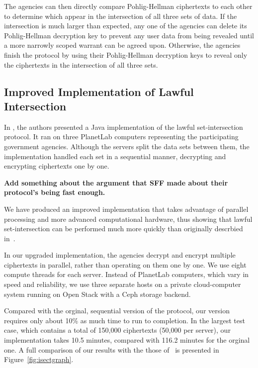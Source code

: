 The agencies can then directly compare Pohlig-Hellman ciphertexts to each 
other to determine which appear in the intersection of all three sets of data. 
If the intersection is much larger than expected, any one of the agencies can 
delete its Pohlig-Hellman decryption key to prevent any user data from being 
revealed until a more narrowly scoped warrant can be agreed upon. Otherwise, 
the agencies finish the protocol by using their Pohlig-Hellman decryption keys 
to reveal only the ciphertexts in the intersection of all three sets.

\subsection{Improved Implementation of Lawful Intersection}

In \cite{sff-foci2014}, the authors presented a Java implementation of the 
lawful set-intersection protocol. It ran on three PlanetLab computers 
representing the participating government agencies. 
Although the servers split the data sets between them, the implementation 
handled each set in a sequential manner, decrypting and encrypting 
ciphertexts one by one.

{\bf Add something about the argument that SFF made about their protocol's
being fast enough.}

We have produced an improved implementation
that takes advantage of parallel processing and more advanced computational 
hardware, thus showing that lawful set-intersection can be performed 
much more quickly than originally descrbied in~\cite{sff-foci2014}. 



In our upgraded implementation, the agencies decrypt and encrypt 
multiple ciphertexts in parallel, rather than operating on them one by one. 
We use eight compute threads for each server. Instead of PlanetLab computers, 
which vary in speed and reliability, we use three separate hosts on a private 
cloud-computer system running on Open Stack with a Ceph storage backend.

Compared with the orginal, sequential version of the protocol, our version 
requires only about 10\% as much time to run to completion. In the 
largest test case, which contains a total of 
150,000 ciphertexts (50,000 per server), our implementation takes 10.5 minutes, 
compared with 116.2 minutes for the orginal one. A full comparison of our 
results with the those of~\cite{sff-foci2014} is presented in 
Figure~\ref{fig:isectgraph}.

